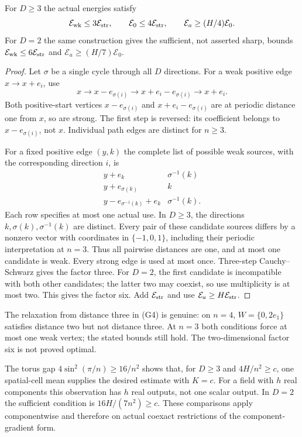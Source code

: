 \begin{theorem}\label{thm:detour190}
For $D\ge3$ the actual energies satisfy
\[
 \mathcal E_{\rm wk}\le3\mathcal E_{\rm str},\qquad
 \mathcal E_0\le4\mathcal E_{\rm str},\qquad
 \mathcal E_a\ge(H/4)\mathcal E_0.
\]
For $D=2$ the same construction gives the sufficient, not asserted sharp,
bounds $\mathcal E_{\rm wk}\le6\mathcal E_{\rm str}$ and
$\mathcal E_a\ge(H/7)\mathcal E_0$.
\end{theorem}
\begin{proof}
Let $\sigma$ be a single cycle through all $D$ directions. For a weak
positive edge $x\to x+e_i$, use
\[
 x\longrightarrow x-e_{\sigma(i)}
 \longrightarrow x+e_i-e_{\sigma(i)}\longrightarrow x+e_i.
\]
Both positive-start vertices $x-e_{\sigma(i)}$ and
$x+e_i-e_{\sigma(i)}$ are at periodic distance one from $x$, so are strong.
The first step is reversed: its coefficient belongs to
$x-e_{\sigma(i)}$, not $x$. Individual path edges are distinct for $n\ge3$.

For a fixed positive edge $(y,k)$ the complete list of possible weak
sources, with the corresponding direction $i$, is
\[
 \begin{array}{c|c}
 y+e_k & \sigma^{-1}(k)\\
 y+e_{\sigma(k)} & k\\
 y-e_{\sigma^{-1}(k)}+e_k & \sigma^{-1}(k).
 \end{array}
\]
Each row specifies at most one actual use. In $D\ge3$, the directions
$k,\sigma(k),\sigma^{-1}(k)$ are distinct. Every pair of these candidate
sources differs by a nonzero vector with coordinates in $\{-1,0,1\}$,
including their periodic interpretation at $n=3$. Thus all pairwise
distances are one, and at most one candidate is weak. Every strong edge
is used at most once. Three-step Cauchy--Schwarz gives the factor three.
For $D=2$, the first candidate is incompatible with both other candidates;
the latter two may coexist, so use multiplicity is at most two. This gives
the factor six. Add $\mathcal E_{\rm str}$ and use
$\mathcal E_a\ge H\mathcal E_{\rm str}$.
\end{proof}
The relaxation from distance three in (G4) is genuine: on $n=4$,
$W=\{0,2e_1\}$ satisfies distance two but not distance three. At $n=3$
both conditions force at most one weak vertex; the stated bounds still
hold. The two-dimensional factor six is not proved optimal.

The torus gap $4\sin^2(\pi/n)\ge16/n^2$ shows that, for $D\ge3$ and
$4H/n^2\ge c$, one spatial-cell mean supplies the desired estimate with
$K=c$. For a field with $h$ real components this observation has $h$ real
outputs, not one scalar output. In $D=2$ the sufficient condition is
$16H/(7n^2)\ge c$. These comparisons apply componentwise and therefore on
actual coexact restrictions of the component-gradient form.

